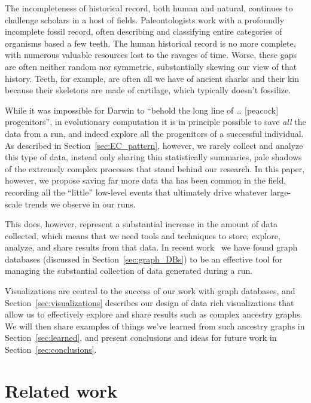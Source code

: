 The incompleteness of historical record, both human and natural, continues
to challenge scholars in a host of fields. Paleontologists work with a 
profoundly
incomplete fossil record, often describing and classifying entire categories of
organisms based a few teeth. The human historical record is no more complete,
with numerous valuable resources lost to the ravages of time. Worse, these 
gaps are often neither random nor symmetric, substantially skewing our view 
of that history. Teeth, for example, are often all we have of ancient 
sharks and their kin because their skeletons are made of cartilage, which
typically doesn't fossilize.

While it was impossible for Darwin to ``behold the long line of \ldots 
[peacock] progenitors'', in evolutionary computation it is in principle possible
to save \emph{all} the data from a run, and indeed explore all the progenitors
of a successful individual. As described in Section~\ref{sec:EC_pattern},
however, we rarely collect and analyze this type of data, instead only sharing
thin statistically summaries, pale shadows of the extremely complex 
processes that stand behind our research. 
In this paper, however, we propose
saving far more data tha has been common in the field, recording all the ``little'' low-level events that ultimately drive whatever large-scale trends 
we observe in our runs.

This does, however, represent a substantial increase in the amount of data
collected, which means that we need tools and techniques to store, explore,
analyze, and share results from that data. In recent work~\cite{graph_db_work}
we have found graph databases (discussed in
Section~\ref{sec:graph_DBs}) to be an effective tool for managing the 
substantial collection of data generated during a run. 

Visualizations are central to the success
of our work with graph databases, and Section~\ref{sec:visualizations}
describes our design of data rich 
visualizations that allow us to effectively explore and share results such as
complex ancestry graphs. We will then share examples of things we've learned
from such ancestry graphs in Section~\ref{sec:learned}, and present conclusions
and ideas for future work in Section~\ref{sec:conclusions}.


\section{Related work}
\label{sec:related}


